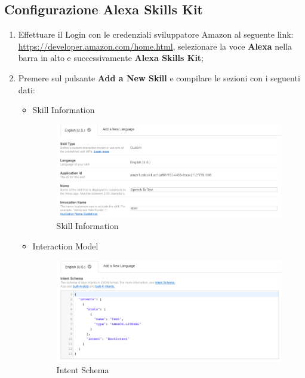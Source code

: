 \documentclass[../ManualeSviluppatore_v2.0.0.tex]{subfiles}
\begin{document}
	\subsection{Configurazione Alexa Skills Kit}
		\begin{enumerate}
			\item Effettuare il Login con le credenziali sviluppatore Amazon al seguente link: \url{https://developer.amazon.com/home.html}, selezionare la voce \textbf{Alexa} nella barra in alto e successivamente \textbf{Alexa Skills Kit};
			\item Premere sul pulsante \textbf{Add a New Skill} e compilare le sezioni con i seguenti dati:
				\begin{itemize}
				\item Skill Information
					\begin{figure}[!h]
						\centering
						\includegraphics[width=\textwidth]{Screenshot/ASK/SkillInformation.png}
						\caption{Skill Information}
					\end{figure}
				\newpage
				\item Interaction Model
					\begin{figure}[!h]
						\centering
						\includegraphics[width=\textwidth]{Screenshot/ASK/InteractionModel1.png}
						\caption{Intent Schema}
					\end{figure}
					\begin{figure}[!h]
						\centering

\end{figure}
\end{itemize}
\end{enumerate}
\end{document}
